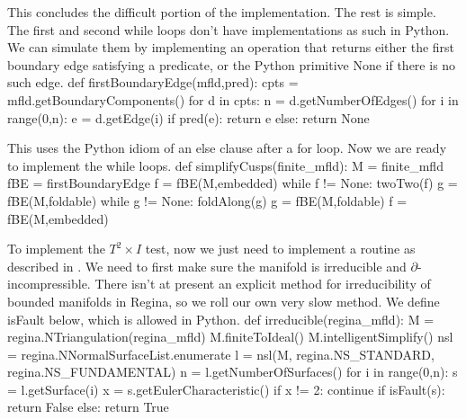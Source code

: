 \documentclass[10pt,twocolumn]{article}%
\theoremstyle{definition}
\begin{document}
\nwendcode{}\nwdocspar
This concludes the difficult portion
of the implementation. The rest is simple.
\nwenddocs{}\nwdocspar
The first and second {\Tt{}while\nwendquote} loops don't
have implementations as such in {\Tt{}Python\nwendquote}.
We can simulate them by implementing an
operation that returns either the first
boundary edge satisfying a predicate,
or the {\Tt{}Python\nwendquote} primitive {\Tt{}None\nwendquote} if
there is no such edge.
\nwenddocs{}\endmoddef\nwstartdeflinemarkup\nwenddeflinemarkup
def firstBoundaryEdge(mfld,pred):
  cpts = mfld.getBoundaryComponents()
  for d in cpts:
    n = d.getNumberOfEdges()
    for i in range(0,n):
      e = d.getEdge(i)
      if pred(e):
        return e
  else:
    return None

\nwendcode{}\nwdocspar
This uses the {\Tt{}Python\nwendquote} idiom
of an {\Tt{}else\nwendquote} clause after a {\Tt{}for\nwendquote} loop.
\nwenddocs{}\nwdocspar
Now we are ready to implement the {\Tt{}while\nwendquote} loops.
\nwenddocs{}\endmoddef\nwstartdeflinemarkup\nwenddeflinemarkup
def simplifyCusps(finite_mfld):
  M = finite_mfld
  fBE = firstBoundaryEdge
  f = fBE(M,embedded)
  while f != None:
    twoTwo(f)
    g = fBE(M,foldable)
    while g != None:
        foldAlong(g)
        g = fBE(M,foldable)
    f = fBE(M,embedded)

\nwendcode{}\nwdocspar
To implement the $T^2\times I$ test,
now we just need to implement a routine
as described in \cite{Me}. We need to
first make sure the manifold is irreducible
and $\partial$-incompressible. There isn't
at present an explicit method for irreducibility
of bounded manifolds in Regina, so we roll
our own very slow method. We define {\Tt{}isFault\nwendquote} below,
which is allowed in {\Tt{}Python\nwendquote}.
\nwenddocs{}\endmoddef\nwstartdeflinemarkup\nwenddeflinemarkup
def irreducible(regina_mfld):
  M = regina.NTriangulation(regina_mfld)
  M.finiteToIdeal()
  M.intelligentSimplify()
  nsl = regina.NNormalSurfaceList.enumerate
  l = nsl(M, regina.NS_STANDARD,  \\
             regina.NS_FUNDAMENTAL)
  n = l.getNumberOfSurfaces()
  for i in range(0,n):
    s = l.getSurface(i)
    x = s.getEulerCharacteristic()
    if x != 2:
      continue
    if isFault(s):
      return False
  else:
    return True
\end{document}
